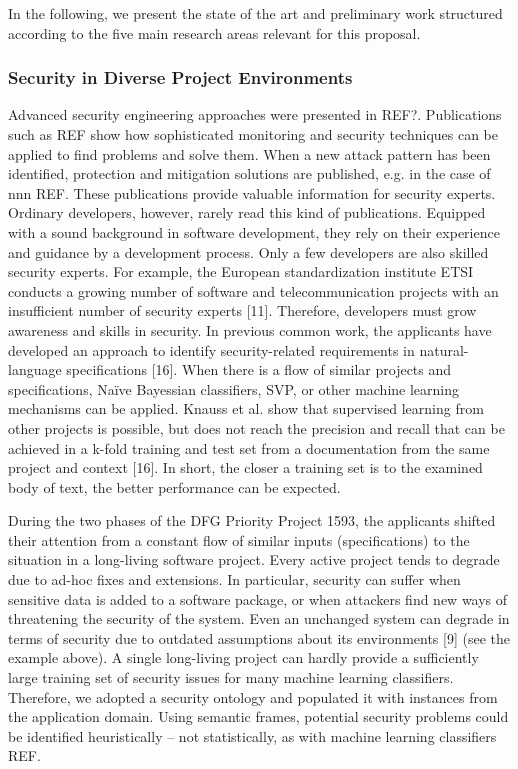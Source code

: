 In the following, we present the state of the art and preliminary work structured according to the five main research areas relevant for this proposal.

\vspace{-0.5em}
\subsubsection*{Security in Diverse Project Environments}
\vspace{-1em}
Advanced security engineering approaches were presented in REF?. Publications such as REF show how sophisticated monitoring and security techniques can be applied to find problems and solve them. When a new attack pattern has been identified, protection and mitigation solutions are published, e.g. in the case of nnn REF. These publications provide valuable information for security experts. Ordinary developers, however, rarely read this kind of publications. Equipped with a sound background in software development, they rely on their experience and guidance by a development process. Only a few developers are also skilled security experts. For example, the European standardization institute ETSI conducts a growing number of software and telecommunication projects with an insufficient number of security experts [11]. Therefore, developers must grow awareness and skills in security. In previous common work, the applicants have developed an approach to identify security-related requirements in natural-language specifications [16]. When there is a flow of similar projects and specifications, Naïve Bayessian classifiers, SVP, or other machine learning mechanisms can be applied. Knauss et al. show that supervised learning from other projects is possible, but does not reach the precision and recall that can be achieved in a k-fold training and test set from a documentation from the same project and context [16]. In short, the closer a training set is to the examined body of text, the better performance can be expected.

During the two phases of the DFG Priority Project 1593, the applicants shifted their attention from a constant flow of similar inputs (specifications) to the situation in a long-living software project. Every active project tends to degrade due to ad-hoc fixes and extensions. In particular, security can suffer when sensitive data is added to a software package, or when attackers find new ways of threatening the security of the system. Even an unchanged system can degrade in terms of security due to outdated assumptions about its environments [9] (see the example above). A single long-living project can hardly provide a sufficiently large training set of security issues for many machine learning classifiers. Therefore, we adopted a security ontology and populated it with instances from the application domain. Using semantic frames, potential security problems could be identified heuristically – not statistically, as with machine learning classifiers REF. 

